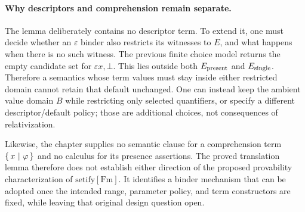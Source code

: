 \paragraph{Why descriptors and comprehension remain separate.}
The lemma deliberately contains no descriptor term. To extend it, one
must decide whether an $\varepsilon$ binder also restricts its witnesses
to $E$, and what happens when there is no such witness. The previous
finite choice model returns the empty candidate set for
$\varepsilon x,\bot$. This lies outside both $E_{\rm present}$ and
$E_{\rm single}$. Therefore a semantics whose term values must stay
inside either restricted domain cannot retain that default unchanged.
One can instead keep the ambient value domain $B$ while restricting
only selected quantifiers, or specify a different descriptor/default
policy; those are additional choices, not consequences of relativization.

Likewise, the chapter supplies no semantic clause for a comprehension
term $\left\{\,x\ \middle|\ \varphi\,\right\}$ and no calculus for its presence assertions.
The proved translation lemma therefore does not establish either
direction of the proposed provability characterization of
$\mathrm{setify}[\mathrm{Fm}]$. It identifies a binder mechanism that
can be adopted once the intended range, parameter policy, and term
constructors are fixed, while leaving that original design question open.


